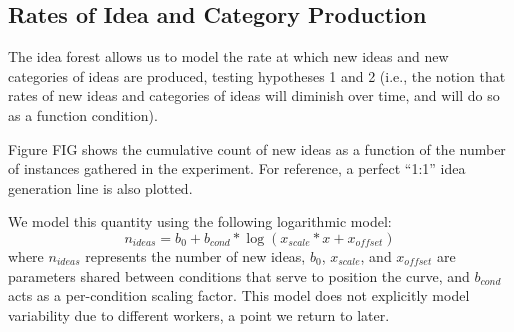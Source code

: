 


\subsection{Rates of Idea and Category Production}
The idea forest allows us to model the rate at which new ideas and new categories of ideas are produced, testing hypotheses 1 and 2 (i.e., the notion that rates of new ideas and categories of ideas will diminish over time, and will do so as a function condition).

Figure FIG shows the cumulative count of new ideas as a function of the number of instances gathered in the experiment. For reference, a perfect ``1:1'' idea generation line is also plotted.

We model this quantity using the following logarithmic model:
\[n_{ideas} = b_0 + b_{cond} * \log (x_{scale} * x + x_{offset})\]
where $n_{ideas}$ represents the number of new ideas, $b_0$, $x_{scale}$, and $x_{offset}$ are parameters shared between conditions that serve to position the curve, and $b_{cond}$ acts as a per-condition scaling factor. This model does not explicitly model variability due to different workers, a point we return to later.

